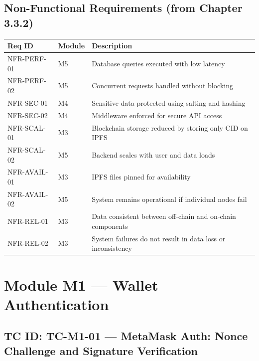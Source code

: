 \documentclass[12pt,a4paper]{article}
\begin{document}
\vspace{0.5cm}

\subsection{Non-Functional Requirements (from Chapter 3.3.2)}

\begin{tabularx}{\textwidth}{llX}
\toprule
\textbf{Req ID} & \textbf{Module} & \textbf{Description} \\
\midrule
NFR-PERF-01 & M5 & Database queries executed with low latency \\
NFR-PERF-02 & M5 & Concurrent requests handled without blocking \\
NFR-SEC-01 & M4 & Sensitive data protected using salting and hashing \\
NFR-SEC-02 & M4 & Middleware enforced for secure API access \\
NFR-SCAL-01 & M3 & Blockchain storage reduced by storing only CID on IPFS \\
NFR-SCAL-02 & M5 & Backend scales with user and data loads \\
NFR-AVAIL-01 & M3 & IPFS files pinned for availability \\
NFR-AVAIL-02 & M5 & System remains operational if individual nodes fail \\
NFR-REL-01 & M3 & Data consistent between off-chain and on-chain components \\
NFR-REL-02 & M3 & System failures do not result in data loss or inconsistency \\
\bottomrule
\end{tabularx}

\newpage

\section{Module M1 --- Wallet Authentication}

\subsection{TC ID: TC-M1-01 --- MetaMask Auth: Nonce Challenge and Signature Verification}
\end{document}
